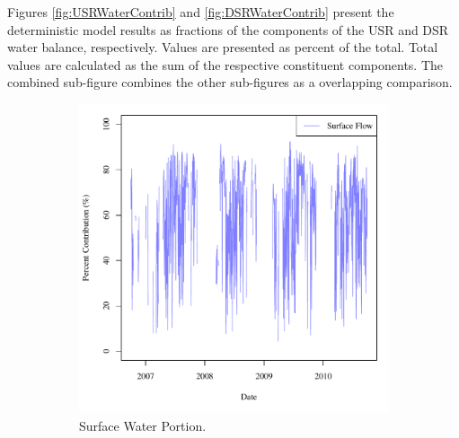 Figures \ref{fig:USRWaterContrib} and \ref{fig:DSRWaterContrib} present the deterministic model results as fractions of the components of the USR and DSR water balance, respectively.  Values are presented as percent of the total.  Total values are calculated as the sum of the respective constituent components.  The combined sub-figure combines the other sub-figures as a overlapping comparison.  

\begin{figure}[htbp]
\centering
	\begin{subfigure}{0.5\textwidth}
		\centering
		\includegraphics[width=\tableCustomSize]{"Figures/Results_USR/Stochastic/M Water Contrib 1"}
		\caption{Surface Water Portion.}
	\end{subfigure}%
	\begin{subfigure}{0.5\textwidth}
		\centering

\end{subfigure}
\end{figure}
